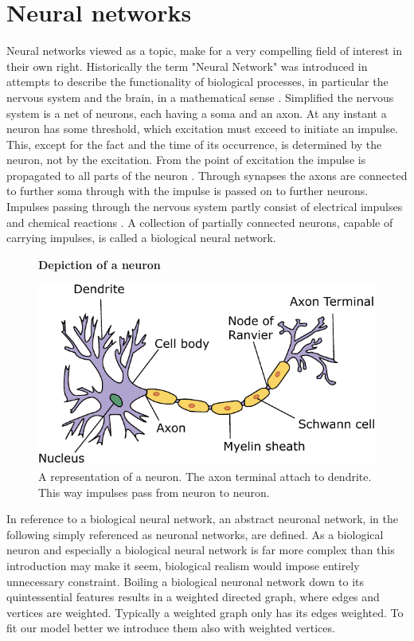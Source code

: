 \documentclass{article}
\theoremstyle{definition}
\newcommand*{\figuretitle}[1]{%
    {\centering%
    \textbf{#1}%
    \par\medskip}%
}
\begin{document}
\newpage

\section{Neural networks}
\label{sec:neural_networks}
Neural networks viewed as a topic, make for a very compelling field of interest in their own right. Historically the term "Neural Network" was introduced in attempts to describe the functionality of biological processes, in particular the nervous system and the brain, in a mathematical sense \cite{mcculloch1943logical, widrow1960adaptive, rumelhart1986learning}. Simplified the nervous system is a net of neurons, each having a soma and an axon. At any instant a neuron has some threshold, which excitation must exceed to initiate an impulse. This, except for the fact and the time of its occurrence, is determined by the neuron, not by the excitation. From the point of excitation the impulse is propagated to all parts of the neuron \cite{mcculloch1943logical}. Through synapses the axons are connected to further soma through with the impulse is passed on to further neurons. Impulses passing through the nervous system partly consist of electrical impulses and chemical reactions \cite{palay1956synapses}. A collection of partially connected neurons, capable of carrying impulses, is called a biological neural network.


\begin{figure}[H]
\centering
\figuretitle{Depiction of a neuron}
\includegraphics[scale=0.75]{graphics/neuron.pdf}
\caption{A representation of a neuron. The axon terminal attach to dendrite. This way impulses pass from neuron to neuron.}
\label{fig:neuron}
\end{figure}

In reference to a biological neural network, an abstract neuronal network, in the following simply referenced as neuronal networks, are defined. As a biological neuron and especially a biological neural network is far more complex than this introduction may make it seem, biological realism would impose entirely unnecessary constraint. Boiling a biological neuronal network down to its quintessential features results in a weighted directed graph, where edges and vertices are weighted. Typically a weighted graph only has its edges weighted. To fit our model better we introduce them also with weighted vertices.
\end{document}
